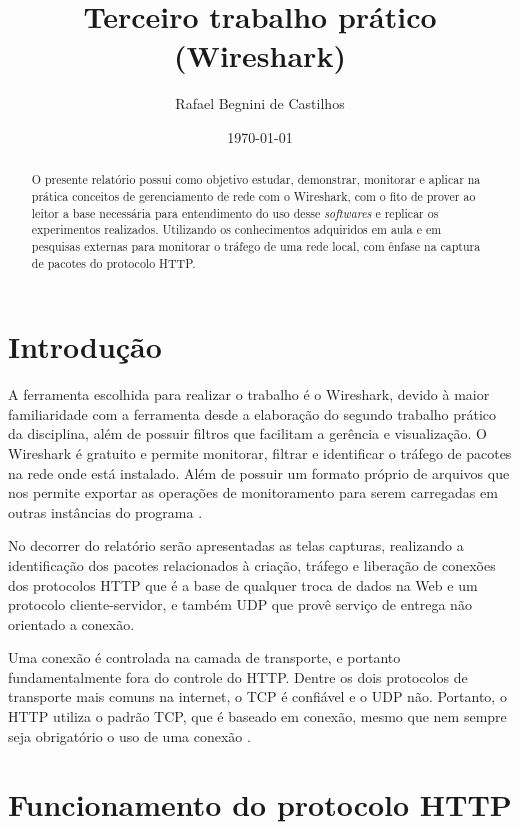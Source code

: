 \documentclass[12pt]{article}
\author{Rafael Begnini de Castilhos}
\title{Terceiro trabalho prático (Wireshark)}
\date{\today}
\begin{document}
\maketitle

\begin{abstract}
O presente relatório possui como objetivo estudar, demonstrar, monitorar e aplicar na prática conceitos de gerenciamento de rede com o Wireshark, com o fito de prover ao leitor a base necessária para entendimento  do uso desse \emph{softwares} e replicar os experimentos realizados. Utilizando os conhecimentos adquiridos em aula e em pesquisas externas para monitorar o tráfego de uma rede local, com ênfase na captura de pacotes do protocolo HTTP.
\end{abstract}

{\setlength\parskip {\fill}
    \tableofcontents
}


\section{Introdução}
A ferramenta escolhida para realizar o trabalho é o Wireshark, devido à maior familiaridade com a ferramenta desde a elaboração do segundo trabalho prático da disciplina, além de possuir filtros que facilitam a gerência e visualização. O Wireshark é gratuito e permite monitorar, filtrar e identificar o tráfego de pacotes na rede onde está instalado. Além de possuir um formato próprio de arquivos que nos permite exportar as operações de monitoramento para serem carregadas em outras instâncias do programa \cite{wireshark}.

No decorrer do relatório serão apresentadas as telas capturas, realizando a identificação dos pacotes relacionados à criação, tráfego e liberação de conexões dos  protocolos HTTP que é a base de qualquer troca de dados na Web e um protocolo cliente-servidor, e também UDP que provê serviço de entrega não orientado a conexão.

Uma conexão é controlada na camada de transporte, e portanto fundamentalmente fora do controle do HTTP. Dentre os dois protocolos de transporte mais comuns na internet, o TCP é confiável e o UDP não. Portanto, o HTTP utiliza o padrão TCP, que é baseado em conexão, mesmo que nem sempre seja obrigatório o uso de uma conexão \cite{mozilla}.

\section{Funcionamento do protocolo HTTP}
\end{document}
